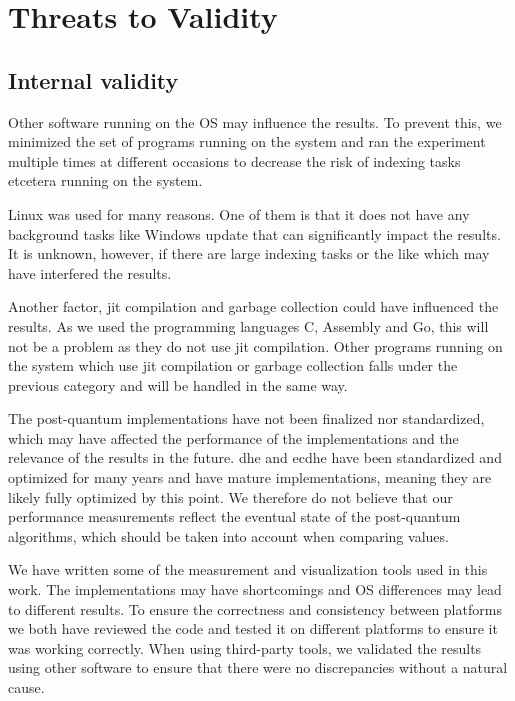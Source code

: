 \section{Threats to Validity}



\subsection{Internal validity}
\label{section:method:internal-validity}
Other software running on the OS may influence the results. To prevent this, we minimized the set of programs running on the system and ran the experiment multiple times at different occasions to decrease the risk of indexing tasks etcetera running on the system.

Linux was used for many reasons. One of them is that it does not have any background tasks like Windows update that can significantly impact the results. It is unknown, however, if there are large indexing tasks or the like which may have interfered the results.

Another factor, \gls{jit} compilation and garbage collection could have influenced the results. As we used the programming languages C, Assembly and Go, this will not be a problem as they do not use \gls{jit} compilation. Other programs running on the system which use \gls{jit} compilation or garbage collection falls under the previous category and will be handled in the same way.

The \gls{post-quantum} implementations have not been finalized nor standardized, which may have affected the performance of the implementations and the relevance of the results in the future. \gls{dhe} and \gls{ecdhe} have been standardized and optimized for many years and have mature implementations, meaning they are likely fully optimized by this point. We therefore do not believe that our performance measurements reflect the eventual state of the \gls{post-quantum} algorithms, which should be taken into account when comparing values.

We have written some of the measurement and visualization tools used in this work. The implementations may have shortcomings and OS differences may lead to different results. To ensure the correctness and consistency between platforms we both have reviewed the code and tested it on different platforms to ensure it was working correctly. When using third-party tools, we validated the results using other software to ensure that there were no discrepancies without a natural cause.

